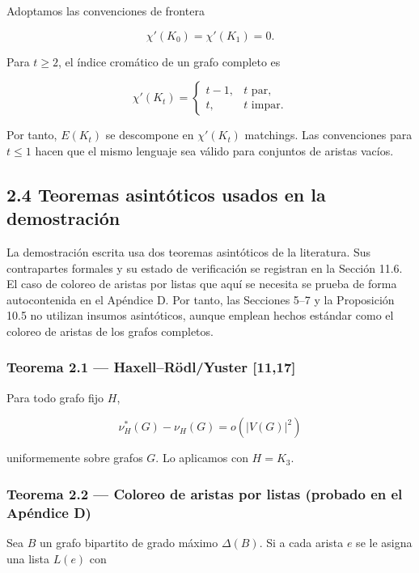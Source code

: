 \documentclass[
  spanish,
  11pt,
  a4paper,
]{article}
\begin{document}
Adoptamos las convenciones de frontera

\[
\chi'(K_0)=\chi'(K_1)=0.
\]

Para \(t\ge2\), el índice cromático de un grafo completo es

\[
\chi'(K_t)
=
\begin{cases}
t-1,&t\text{ par},\\
t,&t\text{ impar}.
\end{cases}
\tag{2.2}
\]

Por tanto, \(E(K_t)\) se descompone en \(\chi'(K_t)\) matchings. Las convenciones para \(t\le1\) hacen que el mismo lenguaje sea válido para conjuntos de aristas vacíos.

\subsection{2.4 Teoremas asintóticos usados en la demostración}\label{teoremas-asintuxf3ticos-usados-en-la-demostraciuxf3n}

La demostración escrita usa dos teoremas asintóticos de la literatura. Sus contrapartes formales y su estado de verificación se registran en la Sección 11.6. El caso de coloreo de aristas por listas que aquí se necesita se prueba de forma autocontenida en el Apéndice D. Por tanto, las Secciones 5--7 y la Proposición 10.5 no utilizan insumos asintóticos, aunque emplean hechos estándar como el coloreo de aristas de los grafos completos.

\subsubsection{Teorema 2.1 --- Haxell--Rödl/Yuster {[}11,17{]}}\label{teorema-2.1-haxellruxf6dlyuster-1117}

Para todo grafo fijo \(H\),

\[
\nu_H^*(G)-\nu_H(G)=o(|V(G)|^2)
\]

uniformemente sobre grafos \(G\). Lo aplicamos con \(H=K_3\).

\subsubsection{Teorema 2.2 --- Coloreo de aristas por listas (probado en el Apéndice D)}\label{teorema-2.2-coloreo-de-aristas-por-listas-probado-en-el-apuxe9ndice-d}

Sea \(B\) un grafo bipartito de grado máximo \(\Delta(B)\). Si a cada arista \(e\) se le asigna una lista \(L(e)\) con
\end{document}
